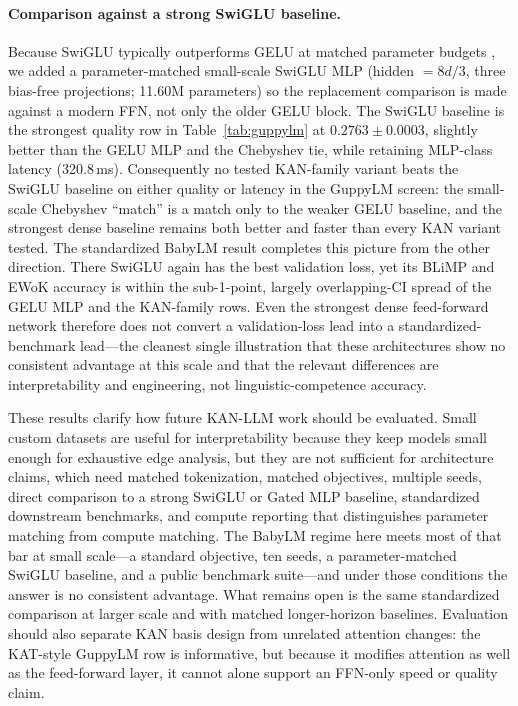 \documentclass{article}
\begin{document}
\paragraph{Comparison against a strong SwiGLU baseline.}
Because SwiGLU typically outperforms GELU at matched parameter budgets \citep{chowdhery2022palm}, we added a parameter-matched small-scale SwiGLU MLP (hidden \(=8d/3\), three bias-free projections; 11.60M parameters) so the replacement comparison is made against a modern FFN, not only the older GELU block. The SwiGLU baseline is the strongest quality row in Table~\ref{tab:guppylm} at \(0.2763\pm0.0003\), slightly better than the GELU MLP and the Chebyshev tie, while retaining MLP-class latency (320.8\,ms). Consequently no tested KAN-family variant beats the SwiGLU baseline on either quality or latency in the GuppyLM screen: the small-scale Chebyshev ``match'' is a match only to the weaker GELU baseline, and the strongest dense baseline remains both better and faster than every KAN variant tested. The standardized BabyLM result completes this picture from the other direction. There SwiGLU again has the best validation loss, yet its BLiMP and EWoK accuracy is within the sub-1-point, largely overlapping-CI spread of the GELU MLP and the KAN-family rows. Even the strongest dense feed-forward network therefore does not convert a validation-loss lead into a standardized-benchmark lead---the cleanest single illustration that these architectures show no consistent advantage at this scale and that the relevant differences are interpretability and engineering, not linguistic-competence accuracy.

These results clarify how future KAN-LLM work should be evaluated. Small custom datasets are useful for interpretability because they keep models small enough for exhaustive edge analysis, but they are not sufficient for architecture claims, which need matched tokenization, matched objectives, multiple seeds, direct comparison to a strong SwiGLU or Gated MLP baseline, standardized downstream benchmarks, and compute reporting that distinguishes parameter matching from compute matching. The BabyLM regime here meets most of that bar at small scale---a standard objective, ten seeds, a parameter-matched SwiGLU baseline, and a public benchmark suite---and under those conditions the answer is no consistent advantage. What remains open is the same standardized comparison at larger scale and with matched longer-horizon baselines. Evaluation should also separate KAN basis design from unrelated attention changes: the KAT-style GuppyLM row is informative, but because it modifies attention as well as the feed-forward layer, it cannot alone support an FFN-only speed or quality claim.
\end{document}
